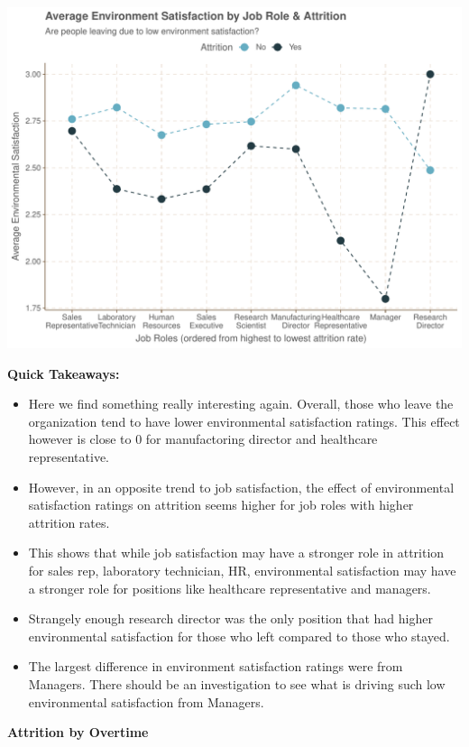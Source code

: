\documentclass[
]{article}
\providecommand{\tightlist}{%
  \setlength{\itemsep}{0pt}\setlength{\parskip}{0pt}}
\begin{document}
\includegraphics{figures/unnamed-chunk-15-1.pdf}

\textbf{Quick Takeaways:}

\begin{itemize}
\tightlist
\item
  Here we find something really interesting again. Overall, those who
  leave the organization tend to have lower environmental satisfaction
  ratings. This effect however is close to 0 for manufactoring director
  and healthcare representative.
\item
  However, in an opposite trend to job satisfaction, the effect of
  environmental satisfaction ratings on attrition seems higher for job
  roles with higher attrition rates.
\item
  This shows that while job satisfaction may have a stronger role in
  attrition for sales rep, laboratory technician, HR, environmental
  satisfaction may have a stronger role for positions like healthcare
  representative and managers.
\item
  Strangely enough research director was the only position that had
  higher environmental satisfaction for those who left compared to those
  who stayed.
\item
  The largest difference in environment satisfaction ratings were from
  Managers. There should be an investigation to see what is driving such
  low environmental satisfaction from Managers.
\end{itemize}

\textbf{Attrition by Overtime}
\end{document}
